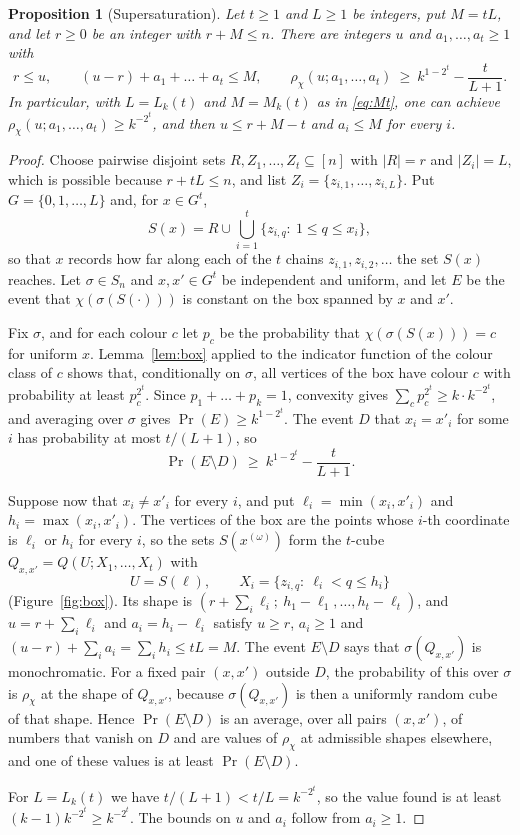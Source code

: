 \documentclass[11pt,reqno]{amsart}
\numberwithin{equation}{section}
\theoremstyle{plain}
\newtheorem{proposition}[theorem]{Proposition}
\theoremstyle{definition}
\theoremstyle{remark}
\begin{document}
\begin{proposition}[Supersaturation]
\label{prop:saturation}
Let $t\ge1$ and $L\ge1$ be integers, put $M=tL$, and let $r\ge0$ be an
integer with $r+M\le n$. There are integers $u$ and $a_1,\dots,a_t\ge1$
with
\[
r\le u,\qquad (u-r)+a_1+\dots+a_t\le M,\qquad
\rho_\chi(u;a_1,\dots,a_t)\ \ge\ k^{1-2^{t}}-\frac{t}{L+1}.
\]
In particular, with $L=L_k(t)$ and $M=M_k(t)$ as in \eqref{eq:Mt}, one
can achieve $\rho_\chi(u;a_1,\dots,a_t)\ge k^{-2^{t}}$, and then $u\le r+M-t$ and
$a_i\le M$ for every $i$.
\end{proposition}

\begin{proof}
Choose pairwise disjoint sets $R,Z_1,\dots,Z_t\subseteq[n]$ with $|R|=r$
and $|Z_i|=L$, which is possible because $r+tL\le n$, and list
$Z_i=\{z_{i,1},\dots,z_{i,L}\}$. Put $G=\{0,1,\dots,L\}$ and, for $x\in
G^{t}$,
\[
S(x)=R\cup\bigcup_{i=1}^{t}\{z_{i,q}:\ 1\le q\le x_i\},
\]
so that $x$ records how far along each of the $t$ chains
$z_{i,1},z_{i,2},\dots$ the set $S(x)$ reaches. Let $\sigma\in S_n$ and
$x,x'\in G^{t}$ be independent and uniform, and let $E$ be the event
that $\chi(\sigma(S(\cdot)))$ is constant on the box spanned by $x$ and
$x'$.

Fix $\sigma$, and for each colour $c$ let $p_c$ be the probability that
$\chi(\sigma(S(x)))=c$ for uniform $x$. Lemma~\ref{lem:box} applied to the
indicator function of the colour class of $c$ shows that, conditionally
on $\sigma$, all vertices of the box have colour $c$ with probability at
least $p_c^{2^{t}}$. Since $p_1+\dots+p_k=1$, convexity gives
$\sum_cp_c^{2^{t}}\ge k\cdot k^{-2^{t}}$, and averaging over $\sigma$ gives
$\Pr(E)\ge k^{1-2^{t}}$. The event $D$ that $x_i=x'_i$ for some $i$ has
probability at most $t/(L+1)$, so
\[
\Pr(E\setminus D)\ \ge\ k^{1-2^{t}}-\frac{t}{L+1}.
\]

Suppose now that $x_i\ne x'_i$ for every $i$, and put
$\ell_i=\min(x_i,x'_i)$ and $h_i=\max(x_i,x'_i)$. The vertices of the box
are the points whose $i$-th coordinate is $\ell_i$ or $h_i$ for every
$i$, so the sets $S(x^{(\omega)})$ form the $t$-cube
$Q_{x,x'}=Q(U;X_1,\dots,X_t)$ with
\[
U=S(\ell),\qquad X_i=\{z_{i,q}:\ \ell_i<q\le h_i\}
\]
(Figure~\ref{fig:box}). Its shape is
$(r+\sum_i\ell_i;\ h_1-\ell_1,\dots,h_t-\ell_t)$, and $u=r+\sum_i\ell_i$
and $a_i=h_i-\ell_i$ satisfy $u\ge r$, $a_i\ge1$ and
$(u-r)+\sum_ia_i=\sum_ih_i\le tL=M$. The event $E\setminus D$ says that
$\sigma(Q_{x,x'})$ is monochromatic. For a fixed pair $(x,x')$ outside
$D$, the probability of this over $\sigma$ is $\rho_\chi$ at the shape of
$Q_{x,x'}$, because $\sigma(Q_{x,x'})$ is then a uniformly random cube of
that shape. Hence $\Pr(E\setminus D)$ is an average, over all pairs
$(x,x')$, of numbers that vanish on $D$ and are values of $\rho_\chi$
at admissible shapes elsewhere, and one of these values is at least
$\Pr(E\setminus D)$.

For $L=L_k(t)$ we have $t/(L+1)<t/L=k^{-2^{t}}$, so the value found is at
least $(k-1)k^{-2^{t}}\ge k^{-2^{t}}$. The bounds on $u$ and $a_i$ follow
from $a_i\ge1$.
\end{proof}
\end{document}
